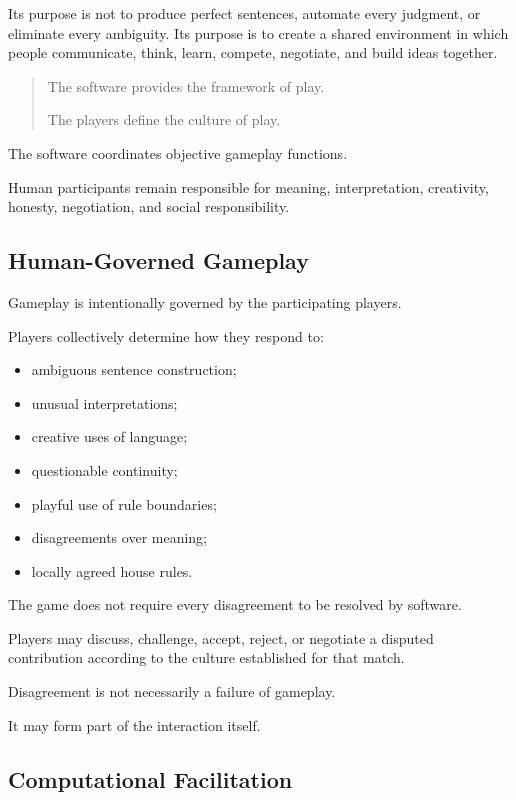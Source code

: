 \documentclass[11pt,a4paper]{article}
\begin{document}
Its purpose is not to produce perfect sentences, automate every judgment, or eliminate every ambiguity. Its purpose is to create a shared environment in which people communicate, think, learn, compete, negotiate, and build ideas together.

\begin{quote}
The software provides the framework of play.

The players define the culture of play.
\end{quote}

The software coordinates objective gameplay functions.

Human participants remain responsible for meaning, interpretation, creativity, honesty, negotiation, and social responsibility.

\subsection{Human-Governed Gameplay}

Gameplay is intentionally governed by the participating players.

Players collectively determine how they respond to:

\begin{itemize}
    \item ambiguous sentence construction;
    \item unusual interpretations;
    \item creative uses of language;
    \item questionable continuity;
    \item playful use of rule boundaries;
    \item disagreements over meaning;
    \item locally agreed house rules.
\end{itemize}

The game does not require every disagreement to be resolved by software.

Players may discuss, challenge, accept, reject, or negotiate a disputed contribution according to the culture established for that match.

Disagreement is not necessarily a failure of gameplay.

It may form part of the interaction itself.

\subsection{Computational Facilitation}
\end{document}
